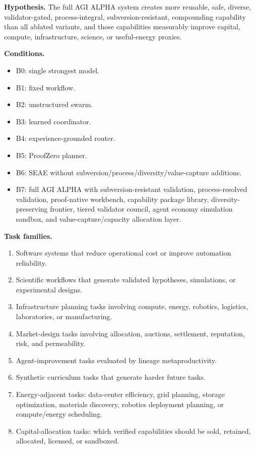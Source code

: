 \textbf{Hypothesis.} The full AGI ALPHA system creates more reusable,
safe, diverse, validator-gated, process-integral, subversion-resistant,
compounding capability than all ablated variants, and those capabilities
measurably improve capital, compute, infrastructure, science, or
useful-energy proxies.

\textbf{Conditions.}

\begin{itemize}
\tightlist
\item
  B0: single strongest model.
\item
  B1: fixed workflow.
\item
  B2: unstructured swarm.
\item
  B3: learned coordinator.
\item
  B4: experience-grounded router.
\item
  B5: ProofZero planner.
\item
  B6: SEAE without subversion/process/diversity/value-capture additions.
\item
  B7: full AGI ALPHA with subversion-resistant validation,
  process-resolved validation, proof-native workbench, capability
  package library, diversity-preserving frontier, tiered validator
  council, agent economy simulation sandbox, and value-capture/capacity
  allocation layer.
\end{itemize}

\textbf{Task families.}

\begin{enumerate}
\def\labelenumi{\arabic{enumi}.}
\tightlist
\item
  Software systems that reduce operational cost or improve automation
  reliability.
\item
  Scientific workflows that generate validated hypotheses, simulations,
  or experimental designs.
\item
  Infrastructure planning tasks involving compute, energy, robotics,
  logistics, laboratories, or manufacturing.
\item
  Market-design tasks involving allocation, auctions, settlement,
  reputation, risk, and permeability.
\item
  Agent-improvement tasks evaluated by lineage metaproductivity.
\item
  Synthetic curriculum tasks that generate harder future tasks.
\item
  Energy-adjacent tasks: data-center efficiency, grid planning, storage
  optimization, materials discovery, robotics deployment planning, or
  compute/energy scheduling.
\item
  Capital-allocation tasks: which verified capabilities should be sold,
  retained, allocated, licensed, or sandboxed.
\end{enumerate}


